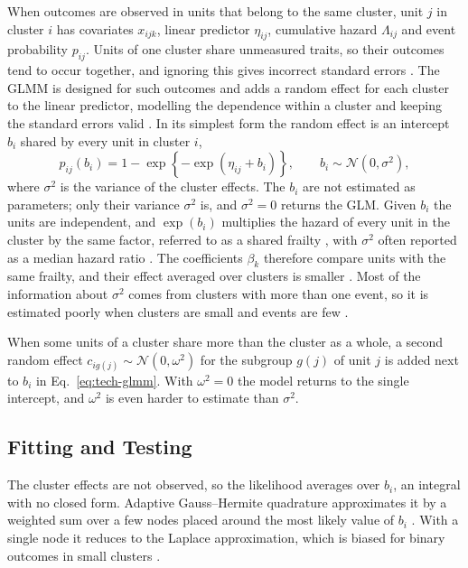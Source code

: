 When outcomes are observed in units that belong to the same cluster, unit $j$ in cluster $i$ has covariates $x_{ijk}$, linear predictor $\eta_{ij}$, cumulative hazard $\Lambda_{ij}$ and event probability $p_{ij}$.
Units of one cluster share unmeasured traits, so their outcomes tend to occur together, and ignoring this gives incorrect standard errors \cite[Section~11.1]{dobson2002glm}.
The GLMM is designed for such outcomes and adds a random effect for each cluster to the linear predictor, modelling the dependence within a cluster and keeping the standard errors valid \cite[Section~11.1]{dobson2002glm}.
In its simplest form the random effect is an intercept $b_i$ shared by every unit in cluster $i$,
\begin{equation}
  p_{ij}(b_i) = 1 - \exp\!\left\{-\exp(\eta_{ij} + b_i)\right\},
  \qquad
  b_i \sim \mathcal{N}(0, \sigma^2),
  \label{eq:tech-glmm}
\end{equation}
where $\sigma^2$ is the variance of the cluster effects.
The $b_i$ are not estimated as parameters; only their variance $\sigma^2$ is, and $\sigma^2 = 0$ returns the GLM.
Given $b_i$ the units are independent, and $\exp(b_i)$ multiplies the hazard of every unit in the cluster by the same factor, referred to as a shared frailty \cite{duchateau2008frailty}, with $\sigma^2$ often reported as a median hazard ratio \cite{austin2017mhr}.
The coefficients $\beta_k$ therefore compare units with the same frailty, and their effect averaged over clusters is smaller \cite{pavlou2015marginal}.
Most of the information about $\sigma^2$ comes from clusters with more than one event, so it is estimated poorly when clusters are small and events are few \cite{moineddin2007multilevel, austin2010clusters}.

\label{sec:tech-nested}%
When some units of a cluster share more than the cluster as a whole, a second random effect $c_{ig(j)} \sim \mathcal{N}(0, \omega^2)$ for the subgroup $g(j)$ of unit $j$ is added next to $b_i$ in Eq.~\eqref{eq:tech-glmm}.
With $\omega^2 = 0$ the model returns to the single intercept, and $\omega^2$ is even harder to estimate than $\sigma^2$.

\subsection{Fitting and Testing}
\label{sec:tech-glmm-likelihood}

The cluster effects are not observed, so the likelihood averages over $b_i$, an integral with no closed form.
Adaptive Gauss--Hermite quadrature approximates it by a weighted sum over a few nodes placed around the most likely value of $b_i$ \cite{liu1994gausshermite, pinheiro1995approximations}.
With a single node it reduces to the Laplace approximation, which is biased for binary outcomes in small clusters \cite{joe2008laplace, statacorp2025mecloglog}.

